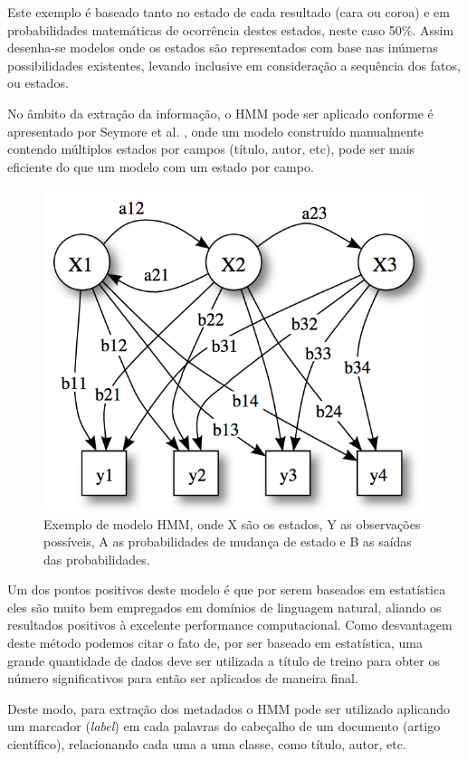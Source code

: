 Este exemplo é baseado tanto no estado de cada resultado (cara ou coroa) e em probabilidades matemáticas de ocorrência destes estados, neste caso 50\%. Assim desenha-se modelos onde os estados são representados com base nas inúmeras possibilidades existentes, levando inclusive em consideração a sequência dos fatos, ou estados.

No âmbito da extração da informação, o HMM pode ser aplicado conforme é apresentado por Seymore et al. \cite{seymore}, onde um modelo construído manualmente contendo múltiplos estados por campos (título, autor, etc), pode ser mais eficiente do que um modelo com um estado por campo. 

\begin{figure}
\centering
\caption{Exemplo de modelo HMM, onde X são os estados, Y as observações possíveis, A as probabilidades de mudança de estado e B as saídas das probabilidades.}
\label{fig:hmm-states}
\includegraphics[width=0.7\linewidth]{./assets/hmm-states}
\end{figure}

Um dos pontos positivos deste modelo é que por serem baseados em estatística eles são muito bem empregados em domínios de linguagem natural, aliando os resultados positivos à excelente performance computacional. Como desvantagem deste método podemos citar o fato de, por ser baseado em estatística, uma grande quantidade de dados deve ser utilizada a título de treino para obter os número significativos para então ser aplicados de maneira final.

Deste modo, para extração dos metadados o HMM pode ser utilizado aplicando um marcador (\textit{label}) em cada palavras do cabeçalho de um documento (artigo científico), relacionando cada uma a uma classe, como título, autor, etc.

